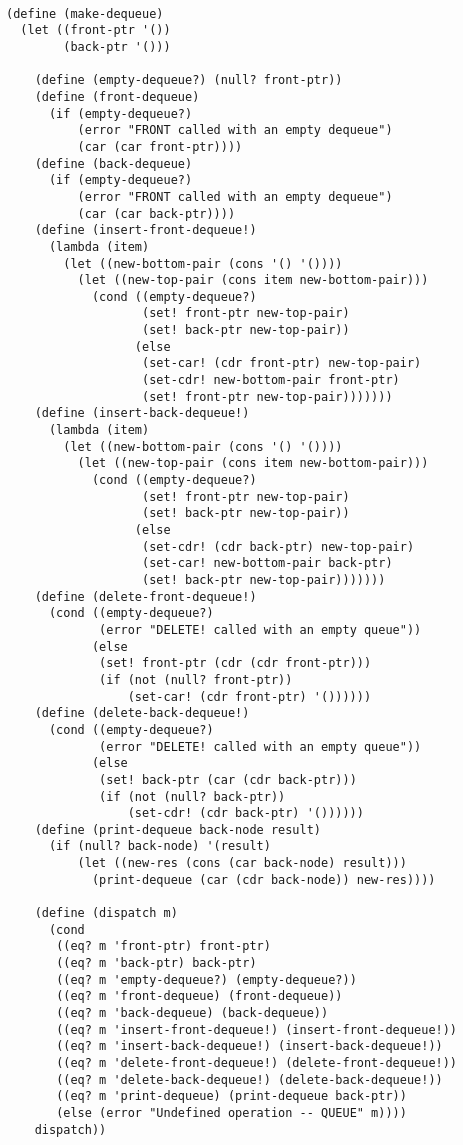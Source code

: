 \documentclass[10pt,a4paper]{article}
\begin{document}
\begin{lstlisting}

(define (make-dequeue)
  (let ((front-ptr '())
        (back-ptr '()))

    (define (empty-dequeue?) (null? front-ptr))
    (define (front-dequeue)
      (if (empty-dequeue?)
          (error "FRONT called with an empty dequeue")
          (car (car front-ptr))))
    (define (back-dequeue)
      (if (empty-dequeue?)
          (error "FRONT called with an empty dequeue")
          (car (car back-ptr))))
    (define (insert-front-dequeue!)
      (lambda (item)
        (let ((new-bottom-pair (cons '() '())))
          (let ((new-top-pair (cons item new-bottom-pair)))
            (cond ((empty-dequeue?)
                   (set! front-ptr new-top-pair)
                   (set! back-ptr new-top-pair))
                  (else
                   (set-car! (cdr front-ptr) new-top-pair)
                   (set-cdr! new-bottom-pair front-ptr)
                   (set! front-ptr new-top-pair)))))))
    (define (insert-back-dequeue!)
      (lambda (item)
        (let ((new-bottom-pair (cons '() '())))
          (let ((new-top-pair (cons item new-bottom-pair)))
            (cond ((empty-dequeue?)
                   (set! front-ptr new-top-pair)
                   (set! back-ptr new-top-pair))
                  (else
                   (set-cdr! (cdr back-ptr) new-top-pair)
                   (set-car! new-bottom-pair back-ptr)
                   (set! back-ptr new-top-pair)))))))
    (define (delete-front-dequeue!)
      (cond ((empty-dequeue?)
             (error "DELETE! called with an empty queue"))
            (else
             (set! front-ptr (cdr (cdr front-ptr)))
             (if (not (null? front-ptr))
                 (set-car! (cdr front-ptr) '())))))
    (define (delete-back-dequeue!)
      (cond ((empty-dequeue?)
             (error "DELETE! called with an empty queue"))
            (else
             (set! back-ptr (car (cdr back-ptr)))
             (if (not (null? back-ptr))
                 (set-cdr! (cdr back-ptr) '())))))
    (define (print-dequeue back-node result)
      (if (null? back-node) '(result)
          (let ((new-res (cons (car back-node) result)))
            (print-dequeue (car (cdr back-node)) new-res))))
    
    (define (dispatch m)
      (cond
       ((eq? m 'front-ptr) front-ptr)
       ((eq? m 'back-ptr) back-ptr)
       ((eq? m 'empty-dequeue?) (empty-dequeue?))
       ((eq? m 'front-dequeue) (front-dequeue))
       ((eq? m 'back-dequeue) (back-dequeue))
       ((eq? m 'insert-front-dequeue!) (insert-front-dequeue!))
       ((eq? m 'insert-back-dequeue!) (insert-back-dequeue!))
       ((eq? m 'delete-front-dequeue!) (delete-front-dequeue!))
       ((eq? m 'delete-back-dequeue!) (delete-back-dequeue!))
       ((eq? m 'print-dequeue) (print-dequeue back-ptr))
       (else (error "Undefined operation -- QUEUE" m))))
    dispatch))


\end{lstlisting}
\end{document}
